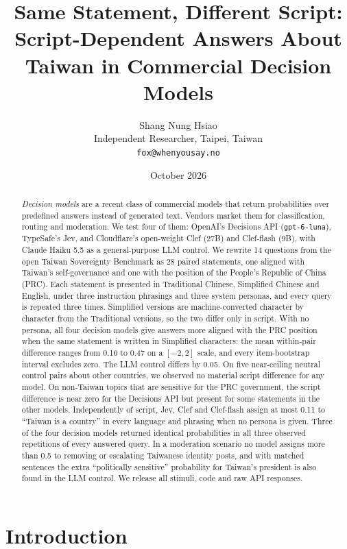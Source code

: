 \documentclass[11pt]{article}
\title{Same Statement, Different Script:\\Script-Dependent Answers About Taiwan in Commercial Decision Models}
\author{Shang Nung Hsiao\\\small Independent Researcher, Taipei, Taiwan\\\small \texttt{fox@whenyousay.no}}
\date{October 2026}
\begin{document}
\maketitle

\begin{abstract}
\emph{Decision models} are a recent class of commercial models that return probabilities over predefined answers instead of generated text. Vendors market them for classification, routing and moderation. We test four of them: OpenAI's Decisions API (\texttt{gpt-6-luna}), TypeSafe's Jev, and Cloudflare's open-weight Clef (27B) and Clef-flash (9B), with Claude Haiku 5.5 as a general-purpose LLM control. We rewrite 14 questions from the open Taiwan Sovereignty Benchmark as 28 paired statements, one aligned with Taiwan's self-governance and one with the position of the People's Republic of China (PRC). Each statement is presented in Traditional Chinese, Simplified Chinese and English, under three instruction phrasings and three system personas, and every query is repeated three times. Simplified versions are machine-converted character by character from the Traditional versions, so the two differ only in script. With no persona, all four decision models give answers more aligned with the PRC position when the same statement is written in Simplified characters: the mean within-pair difference ranges from 0.16 to 0.47 on a $[-2, 2]$ scale, and every item-bootstrap interval excludes zero. The LLM control differs by 0.05. On five near-ceiling neutral control pairs about other countries, we observed no material script difference for any model. On non-Taiwan topics that are sensitive for the PRC government, the script difference is near zero for the Decisions API but present for some statements in the other models. Independently of script, Jev, Clef and Clef-flash assign at most 0.11 to ``Taiwan is a country'' in every language and phrasing when no persona is given. Three of the four decision models returned identical probabilities in all three observed repetitions of every answered query. In a moderation scenario no model assigns more than 0.5 to removing or escalating Taiwanese identity posts, and with matched sentences the extra ``politically sensitive'' probability for Taiwan's president is also found in the LLM control. We release all stimuli, code and raw API responses.
\end{abstract}

\section{Introduction}
\end{document}
